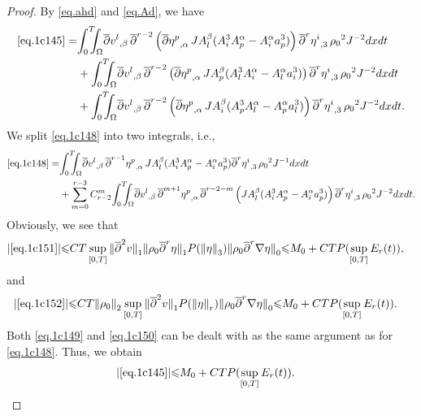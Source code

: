 \documentclass[12pt,twoside,reqno]{amsart}
\numberwithin{equation}{section}
\theoremstyle{definition}
\theoremstyle{remark}
\begin{document}
\begin{proof}
By \eqref{eq.ahd} and \eqref{eq.Ad}, we have
\begin{align}
  \eqref{eq.1c145}=&{\int_0^T\!\!\!\!\int_\Omega }  {\overline{\partial}} {{{v^l}}_{,{\beta}}\,}{\overline{\partial}}^{r-2}\left({\overline{\partial}}{{{\eta^p}}_{,{\alpha}}\,} JA^\beta_l(A^3_iA^\alpha_p-A^\alpha_ia^3_p)\right){{{{\overline{\partial}}^r \eta^i}}_{,{3}}\,}{\rho_0}^2  J^{-2}dxdt\label{eq.1c148}\\
  &+{\int_0^T\!\!\!\!\int_\Omega }  {\overline{\partial}} {{{v^l}}_{,{\beta}}\,}{\overline{\partial}}^{r-2}\left({\overline{\partial}}{{{\eta^p}}_{,{\alpha}}\,} JA^\beta_p(A^3_lA^\alpha_i-A^\alpha_la^3_i)\right){{{{\overline{\partial}}^r \eta^i}}_{,{3}}\,}{\rho_0}^2  J^{-2}dxdt\label{eq.1c149}\\
  &+{\int_0^T\!\!\!\!\int_\Omega }  {\overline{\partial}} {{{v^l}}_{,{\beta}}\,}{\overline{\partial}}^{r-2}\left({\overline{\partial}}{{{\eta^p}}_{,{\alpha}}\,} JA^\beta_i(A^3_pA^\alpha_l-A^\alpha_pa^3_l)\right){{{{\overline{\partial}}^r \eta^i}}_{,{3}}\,}{\rho_0}^2  J^{-2}dxdt.\label{eq.1c150}
\end{align}
We split \eqref{eq.1c148} into two integrals, i.e.,
\begin{align}
  \eqref{eq.1c148}=&{\int_0^T\!\!\!\!\int_\Omega }  {\overline{\partial}} {{{v^l}}_{,{\beta}}\,}{\overline{\partial}}^{r-1}{{{\eta^p}}_{,{\alpha}}\,} JA^\beta_l(A^3_iA^\alpha_p-A^\alpha_ia^3_p){{{{\overline{\partial}}^r \eta^i}}_{,{3}}\,}{\rho_0}^2  J^{-1}dxdt\label{eq.1c151}\\
  &+\sum_{m=0}^{r-3}C_{r-2}^m{\int_0^T\!\!\!\!\int_\Omega }  {\overline{\partial}} {{{v^l}}_{,{\beta}}\,}{\overline{\partial}}^{m+1}{{{\eta^p}}_{,{\alpha}}\,}{\overline{\partial}}^{r-2-m}\left( JA^\beta_l(A^3_iA^\alpha_p-A^\alpha_ia^3_p)\right){{{{\overline{\partial}}^r \eta^i}}_{,{3}}\,}{\rho_0}^2  J^{-2}dxdt.\label{eq.1c152}
\end{align}
Obviously, we see that
\begin{align*}
  {\vert{\eqref{eq.1c151}}\vert}{\leqslant}&CT\sup_{[0,T]}{\Vert{{\overline{\partial}}^2v}\Vert}_1{\Vert{{\rho_0} {\overline{\partial}}^r\eta}\Vert}_1 P({\Vert{\eta}\Vert}_3){\Vert{{\rho_0} {\overline{\partial}}^r{\nabla}\eta}\Vert}_0
  {\leqslant} M_0+CTP(\sup_{[0,T]}E_r(t)),
\end{align*}
and
\begin{align*}
  {\vert{\eqref{eq.1c152}}\vert}{\leqslant} &CT{\Vert{\rho_0}\Vert}_2\sup_{[0,T]} {\Vert{{\overline{\partial}}^2 v}\Vert}_1P({\Vert{\eta}\Vert}_r){\Vert{{\rho_0} {\overline{\partial}}^r{\nabla}\eta}\Vert}_0
  {\leqslant} M_0+CTP(\sup_{[0,T]}E_r(t)).
\end{align*}
Both \eqref{eq.1c149} and \eqref{eq.1c150} can be dealt with as the same argument as for \eqref{eq.1c148}. Thus, we obtain
\begin{align*}
  {\vert{\eqref{eq.1c145}}\vert}{\leqslant} &M_0+CTP(\sup_{[0,T]}E_r(t)).
\end{align*}


\end{proof}
\end{document}
